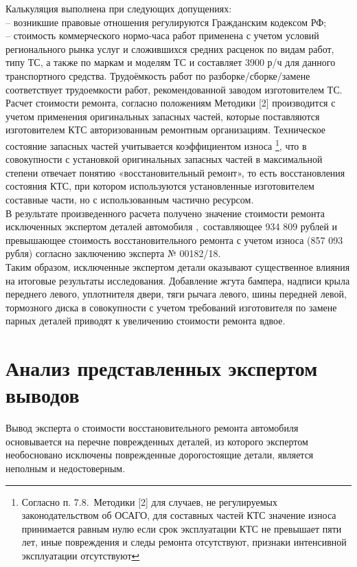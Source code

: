 \noindent Калькуляция выполнена при следующих допущениях:\\
-- возникшие правовые отношения  регулируются Гражданским кодексом РФ;\\
-- стоимость коммерческого нормо-часа работ применена  с учетом условий регионального рынка услуг и сложившихся средних расценок по видам работ, типу ТС, а также по маркам и моделям ТС  и   составляет 3900 р/ч для данного транспортного средства. Трудоёмкость работ по разборке/сборке/замене  соответствует трудоемкости работ, рекомендованной заводом изготовителем ТС. Расчет стоимости ремонта, согласно положениям Методики [2] производится с учетом  применения оригинальных запасных частей, которые поставляются изготовителем КТС авторизованным ремонтным организациям. Техническое состояние запасных частей учитывается коэффициентом износа \footnote{Согласно п. 7.8.\, Методики [2]  для случаев, не регулируемых законодательством об ОСАГО, для составных частей КТС значение износа принимается равным нулю если  срок эксплуатации КТС не превышает пяти лет, иные повреждения и следы ремонта отсутствуют, признаки интенсивной эксплуатации отсутствуют }, что в совокупности с установкой оригинальных запасных частей в максимальной степени отвечает понятию «восстановительный ремонт», то есть восстановления состояния КТС, при котором используются установленные изготовителем составные части, но с использованным частично ресурсом.\\
В результате произведенного расчета получено значение  стоимости ремонта исключенных экспертом деталей автомобиля ,\, составляющее  934 809 рублей и превышающее стоимость восстановительного ремонта с учетом износа (857 093 рубля) согласно заключению эксперта № 00182/18.\\
\indent Таким образом,  исключенные экспертом детали оказывают существенное влияния на итоговые результаты исследования. Добавление жгута бампера, надписи крыла переднего левого, уплотнителя двери, тяги рычага левого, шины передней левой, тормозного диска в совокупности с учетом требований изготовителя по замене парных деталей приводят к увеличению стоимости ремонта вдвое.


\section{ Анализ представленных экспертом выводов}

Вывод эксперта о стоимости восстановительного ремонта автомобиля  \, основывается на перечне поврежденных деталей, из которого экспертом  не\-обосновано  исключены поврежденные дорогостоящие детали, является неполным и недостоверным.

